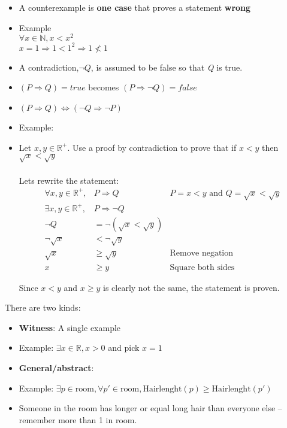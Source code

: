 \documentclass[english,10pt,a4paper]{article}
\begin{document}
\begin{theo}[Counterexample] 
\begin{itemize}
\item A counterexample is \textbf{one case} that proves a statement \textbf{wrong}
\item Example
\\
$\forall x \in \mathbb{N}, x < x^2$ \\
$x=1 \Rightarrow 1 < 1^2 \Rightarrow 1 \not < 1$
\end{itemize}
\end{theo}

\begin{theo} 
\begin{itemize}
\item A contradiction,$\neg Q$, is assumed to be false so that \textit{Q} is true.
\item[] $(P \Rightarrow Q) = true$ becomes $(P \Rightarrow \neg Q) = false$
\item[] $(P \Rightarrow Q) \Leftrightarrow (\neg Q \Rightarrow \neg P)$
\item Example:
\item[] Let $x, y \in \mathbb{R}^{+}$. Use a proof by contradiction to prove that if $x<y$ then $\sqrt{x} < \sqrt{y}$
\\
\\
Lets rewrite the statement:
\begin{align}
\forall x, y \in \mathbb{R}^+, &P \Rightarrow Q & P = x < y \text{ and } Q = \sqrt{x}<\sqrt{y} \\
\exists x, y \in \mathbb{R}^+, &P \Rightarrow \neg Q \\
\neg Q &= \neg(\sqrt{x} < \sqrt{y})\\
\neg\sqrt{x} &< \neg \sqrt{y} \\
\sqrt{x} &\geq \sqrt{y} & \text{Remove negation}\\
x &\geq y & \text{Square both sides}
\end{align}

Since $x<y$ and $x\geq y$ is clearly not the same, the statement is proven.
\end{itemize}
\end{theo}


\begin{theo} 
 There are two kinds:
\begin{itemize}
\item \textbf{Witness}: A single example
\item[] Example: $\exists x \in \mathbb{R}, x > 0$ and pick $x=1$
\item \textbf{General/abstract}: 
\item[] Example: $\exists p \in \text{room}, \forall p' \in \text{room}, \text{Hairlenght}(p) \geq \text{Hairlenght}(p')$
\item[] Someone in the room has longer or equal long hair than everyone else -- remember more than 1 in room.
\end{itemize}
\end{theo}
\end{document}
